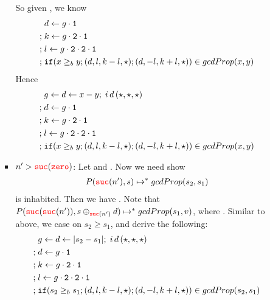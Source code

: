\begin{enumerate}
\begin{itemize}
\begin{itemize}
            So given , we know 
            \begin{align*}
              \isComp{\bind{\fst{g}\\}{&d}{
                \bind{\fst{\snd{g}}\\}{&k}{
                  \bind{\fst{\snd{\snd{g}}}\\}{&l}{
                    &\ifthen{x \ge_b y}{(d,l,k-l,\triv)}{(d,-l,k+l,\triv)}}
            }}}{gcdProp(x,y)}
            \end{align*}
            Hence 
            \begin{align*}
              \isComp{
                \bind{\bind{x-y}{d}{i\, d\, (\triv,\triv,\triv)\\}}{&g}{
              \bind{\fst{g}\\}{&d}{
                \bind{\fst{\snd{g}}\\}{&k}{
                  \bind{\fst{\snd{\snd{g}}}\\}{&l}{
                    &\ifthen{x \ge_b y}{(d,l,k-l,\triv)}{(d,-l,k+l,\triv)}}}
            }}}{gcdProp(x,y)}
            \end{align*}
          \item $n' > \suc{\zero}$:
            Let  and .
            Now we need show 
            \begin{align*}
              P(\suc{n'},s) \mapsto^* gcdProp(s_2,s_1)
            \end{align*}
            is inhabited. Then we have 
            . 
            Note that $P(\suc{\suc{n'}}, s \oplus_{\suc{n'}} d) \mapsto^* 
            gcdProp(s_1,v)$, where .
            Similar to above, we case on $s_2 \ge s_1$, and derive the following:
            \begin{align*}
              \isComp{
                \bind{\bind{|s_2-s_1|}{d}{i\, d\, (\triv,\triv,\triv)\\}}{&g}{
              \bind{\fst{g}\\}{&d}{
                \bind{\fst{\snd{g}}\\}{&k}{
                  \bind{\fst{\snd{\snd{g}}}\\}{&l}{
                    &\ifthen{s_2 \ge_b s_1}{(d,l,k-l,\triv)}{(d,-l,k+l,\triv)}}}
            }}}{gcdProp(s_2,s_1)}
            \end{align*}
        \end{itemize}

\end{itemize}
\end{enumerate}
